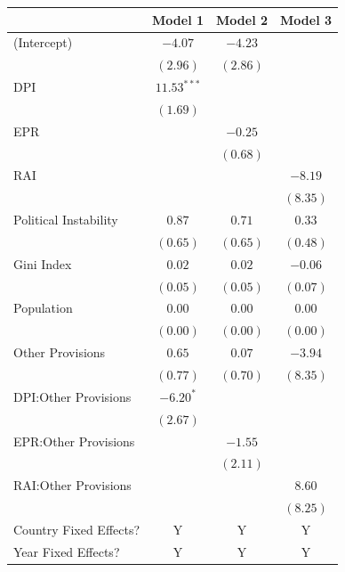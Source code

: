 \documentclass[12pt]{article}
\begin{document}
\begin{table}[!htbp]
	\begin{center}
		\begin{tabular}{l c c c }
			\hline
			& Model 1 & Model 2 & Model 3 \\
			\hline
			(Intercept)                          & $-4.07$       & $-4.23$  &          \\
			& $(2.96)$      & $(2.86)$ &          \\
			DPI                           & $11.53^{***}$ &          &          \\
			& $(1.69)$      &          &          \\
			EPR                   &               & $-0.25$  &          \\
			&               & $(0.68)$ &          \\
			RAI                          &               &          & $-8.19$  \\
			&               &          & $(8.35)$ \\
			Political Instability                       & $0.87$        & $0.71$   & $0.33$   \\
			& $(0.65)$      & $(0.65)$ & $(0.48)$ \\
			Gini Index                      & $0.02$        & $0.02$   & $-0.06$  \\
			& $(0.05)$      & $(0.05)$ & $(0.07)$ \\
			Population                        & $0.00$        & $0.00$   & $0.00$   \\
			& $(0.00)$      & $(0.00)$ & $(0.00)$ \\
			Other Provisions                    & $0.65$        & $0.07$   & $-3.94$  \\
			& $(0.77)$      & $(0.70)$ & $(8.35)$ \\
			DPI:Other Provisions         & $-6.20^{*}$   &          &          \\
			& $(2.67)$      &          &          \\
			EPR:Other Provisions &               & $-1.55$  &          \\
			&               & $(2.11)$ &          \\
			RAI:Other Provisions        &               &          & $8.60$   \\
			&               &          & $(8.25)$ \\
			\hline
			Country Fixed Effects?		 		 & Y			 & Y 		& Y			  \\
			Year Fixed Effects?			 		 & Y			 & Y		& Y			  \\

\end{tabular}
\end{center}
\end{table}
\end{document}
